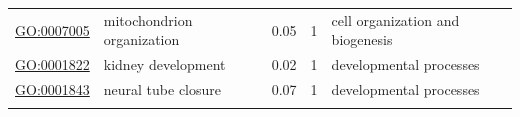 \documentclass[
]{article}
\begin{document}
\begin{longtable}[]{@{}lllll@{}}
\begin{minipage}[t]{0.17\columnwidth}\raggedright
\url{GO:0007005}\strut
\end{minipage} & \begin{minipage}[t]{0.17\columnwidth}\raggedright
mitochondrion organization\strut
\end{minipage} & \begin{minipage}[t]{0.17\columnwidth}\raggedright
0.05\strut
\end{minipage} & \begin{minipage}[t]{0.17\columnwidth}\raggedright
1\strut
\end{minipage} & \begin{minipage}[t]{0.17\columnwidth}\raggedright
cell organization and biogenesis\strut
\end{minipage}\tabularnewline
\begin{minipage}[t]{0.17\columnwidth}\raggedright
\url{GO:0001822}\strut
\end{minipage} & \begin{minipage}[t]{0.17\columnwidth}\raggedright
kidney development\strut
\end{minipage} & \begin{minipage}[t]{0.17\columnwidth}\raggedright
0.02\strut
\end{minipage} & \begin{minipage}[t]{0.17\columnwidth}\raggedright
1\strut
\end{minipage} & \begin{minipage}[t]{0.17\columnwidth}\raggedright
developmental processes\strut
\end{minipage}\tabularnewline
\begin{minipage}[t]{0.17\columnwidth}\raggedright
\url{GO:0001843}\strut
\end{minipage} & \begin{minipage}[t]{0.17\columnwidth}\raggedright
neural tube closure\strut
\end{minipage} & \begin{minipage}[t]{0.17\columnwidth}\raggedright
0.07\strut
\end{minipage} & \begin{minipage}[t]{0.17\columnwidth}\raggedright
1\strut
\end{minipage} & \begin{minipage}[t]{0.17\columnwidth}\raggedright
developmental processes\strut
\end{minipage}\tabularnewline
\begin{minipage}[t]{0.17\columnwidth}\raggedright

\end{minipage}
\end{longtable}
\end{document}
